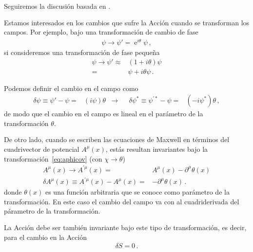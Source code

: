 Seguiremos la discusión basada en \cite{Brading:2000hc,Brading:2003nv,Sundermeyer:2014kha}.

\begin{frame}
Estamos interesados en los cambios que sufre la Acción cuando se transforman los campos. Por ejemplo, bajo una transformación de cambio de fase
\begin{align}
  \label{eq:phchg}
  \psi \to \psi'=\operatorname{e}^{i \theta}\psi\,,
\end{align}
si consideremos una transformación de fase pequeña
\begin{align}
  \psi \to \psi'\approx& (1+i\theta)\psi \nonumber\\
                      =&  \psi+i\theta\psi\,.
\end{align} 

Podemos definir el cambio en el campo como
\begin{align}
  \label{eq:deltamatter}
  \delta \psi\equiv \psi'-\psi=&(i\psi) \theta &\to&  & \delta \psi^{*}\equiv \psi^{\prime *}-\psi=&(-i\psi^{*}) \theta \,,
\end{align}
de modo que el cambio en el campo es lineal en el parámetro de la transformación $\theta$.
\end{frame}

\begin{frame}
De otro lado, cuando se escriben las ecuaciones de Maxwell en términos del cuadrivector de potencial $A^{\mu}(x)$,      estás resultan invariantes bajo la transformación~\eqref{eq:aphicov} (con $\chi\to\theta$)
\begin{align}
  \label{eq:deltarad}
  A^{\mu}(x)\to A^{\prime\mu}(x)= &  A^{\mu}(x) -\partial^{\mu} \theta(x) \nonumber\\
    \delta A^{\mu}(x)\equiv A^{\prime\mu}(x) -A^{\mu}(x)=& -\partial^{\mu} \theta(x)\,.
\end{align}
donde $\theta(x)$ es una función arbitraria que se conoce como parámetro de la transformación. En este caso el cambio del campo va con al cuadriderivada del párametro de la transformación.

La Acción  debe ser también invariante bajo este tipo de transformación, es decir, para el cambio en la Acción
\begin{align}
  \delta S=0\,.
\end{align}
\end{frame}


